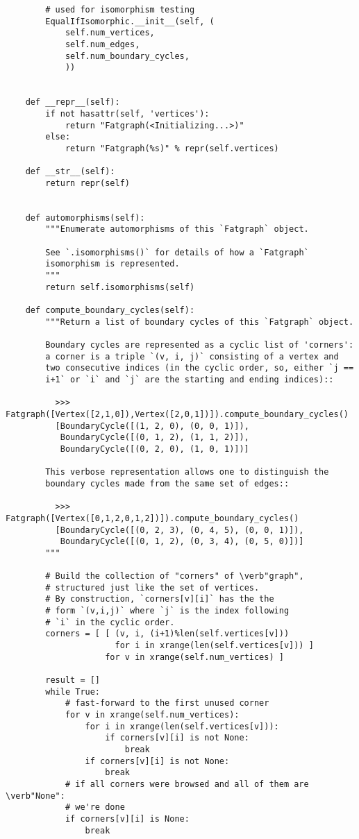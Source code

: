 \begin{lstlisting}
        # used for isomorphism testing
        EqualIfIsomorphic.__init__(self, (
            self.num_vertices,
            self.num_edges,
            self.num_boundary_cycles,
            ))


    def __repr__(self):
        if not hasattr(self, 'vertices'):
            return "Fatgraph(<Initializing...>)"
        else:
            return "Fatgraph(%s)" % repr(self.vertices)
    
    def __str__(self):
        return repr(self)


    def automorphisms(self):
        """Enumerate automorphisms of this `Fatgraph` object.

        See `.isomorphisms()` for details of how a `Fatgraph`
        isomorphism is represented.
        """
        return self.isomorphisms(self)

    def compute_boundary_cycles(self):
        """Return a list of boundary cycles of this `Fatgraph` object.

        Boundary cycles are represented as a cyclic list of 'corners':
        a corner is a triple `(v, i, j)` consisting of a vertex and
        two consecutive indices (in the cyclic order, so, either `j ==
        i+1` or `i` and `j` are the starting and ending indices)::
        
          >>> Fatgraph([Vertex([2,1,0]),Vertex([2,0,1])]).compute_boundary_cycles()
          [BoundaryCycle([(1, 2, 0), (0, 0, 1)]),
           BoundaryCycle([(0, 1, 2), (1, 1, 2)]),
           BoundaryCycle([(0, 2, 0), (1, 0, 1)])]

        This verbose representation allows one to distinguish the
        boundary cycles made from the same set of edges::

          >>> Fatgraph([Vertex([0,1,2,0,1,2])]).compute_boundary_cycles()
          [BoundaryCycle([(0, 2, 3), (0, 4, 5), (0, 0, 1)]),
           BoundaryCycle([(0, 1, 2), (0, 3, 4), (0, 5, 0)])]
        """
        
        # Build the collection of "corners" of \verb"graph",
        # structured just like the set of vertices.
        # By construction, `corners[v][i]` has the the
        # form `(v,i,j)` where `j` is the index following
        # `i` in the cyclic order.
        corners = [ [ (v, i, (i+1)%len(self.vertices[v]))
                      for i in xrange(len(self.vertices[v])) ]
                    for v in xrange(self.num_vertices) ]

        result = []
        while True:
            # fast-forward to the first unused corner
            for v in xrange(self.num_vertices):
                for i in xrange(len(self.vertices[v])):
                    if corners[v][i] is not None:
                        break
                if corners[v][i] is not None:
                    break
            # if all corners were browsed and all of them are \verb"None":
            # we're done
            if corners[v][i] is None:
                break


\end{lstlisting}
